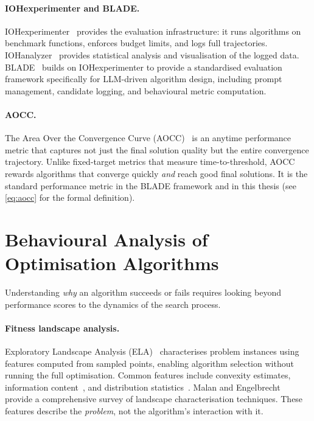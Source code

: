 \paragraph{IOHexperimenter and BLADE.}
IOHexperimenter~\cite{deNobel2024iohexperimenter} provides the evaluation infrastructure: it runs algorithms on benchmark functions, enforces budget limits, and logs full trajectories. IOHanalyzer~\cite{wang2022iohanalyzer} provides statistical analysis and visualisation of the logged data. BLADE~\cite{vanStein2025BLADE} builds on IOHexperimenter to provide a standardised evaluation framework specifically for LLM-driven algorithm design, including prompt management, candidate logging, and behavioural metric computation.

\paragraph{AOCC.}
The Area Over the Convergence Curve (AOCC)~\cite{vanStein2025BLADE} is an anytime performance metric that captures not just the final solution quality but the entire convergence trajectory. Unlike fixed-target metrics that measure time-to-threshold, AOCC rewards algorithms that converge quickly \emph{and} reach good final solutions. It is the standard performance metric in the BLADE framework and in this thesis (see \cref{eq:aocc} for the formal definition).

\section{Behavioural Analysis of Optimisation Algorithms}
\label{sec:bg-behaviour}

Understanding \emph{why} an algorithm succeeds or fails requires looking beyond performance scores to the dynamics of the search process.

\paragraph{Fitness landscape analysis.}
Exploratory Landscape Analysis (ELA)~\cite{mersmann2011ela} characterises problem instances using features computed from sampled points, enabling algorithm selection without running the full optimisation. Common features include convexity estimates, information content~\cite{munoz2015information}, and distribution statistics~\cite{kerschke2019flacco}. Malan and Engelbrecht~\cite{malan2013landscape} provide a comprehensive survey of landscape characterisation techniques. These features describe the \emph{problem}, not the algorithm's interaction with it.

